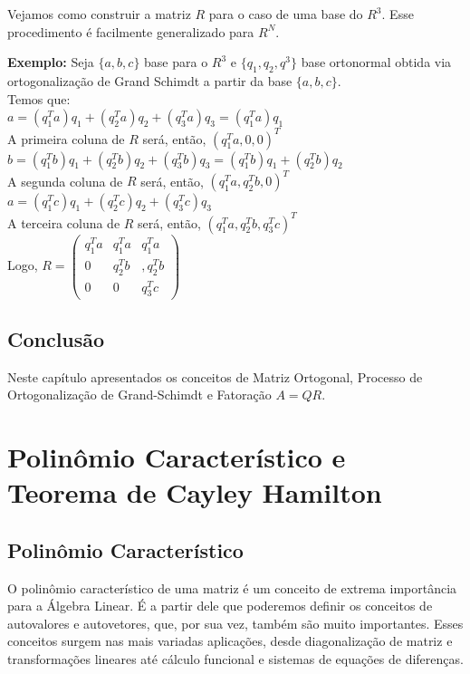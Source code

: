 \documentclass[12pt]{article}
\begin{document}
Vejamos como construir a matriz $R$ para o caso de uma base do $R^3$. Esse procedimento é facilmente generalizado para $R^N$.

\textbf{Exemplo:} Seja $\{a,b,c\}$ base para o $R^3$ e $\{q_1,q_2,q^3\}$ base ortonormal obtida via ortogonalização de Grand Schimdt a partir da base $\{a,b,c\}$.\\

Temos que:\\

$a=(q_1^Ta)q_1+(q_2^Ta)q_2+(q_3^Ta)q_3=(q_1^Ta)q_1$\\

A primeira coluna de $R$ será, então, $(q_1^{T}a,0,0)^T$\\

$b=(q_1^Tb)q_1+(q_2^Tb)q_2+(q_3^Tb)q_3=(q_1^Tb)q_1+(q_2^Tb)q_2$\\

A segunda coluna de $R$ será, então, $(q_1^{T}a,q_2^Tb,0)^T$\\

$a=(q_1^Tc)q_1+(q_2^Tc)q_2+(q_3^Tc)q_3$\\

A terceira coluna de $R$ será, então, $(q_1^{T}a,q_2^Tb,q_3^Tc)^T$\\

Logo, $R=\begin{pmatrix}
	q_1^{T}a & q_1^{T}a & q_1^{T}a\\
	0 &  q_2^Tb& ,q_2^Tb\\ 
	0 & 0 & q_3^Tc
\end{pmatrix}$

\subsection{Conclusão}
Neste capítulo apresentados os conceitos de Matriz Ortogonal, Processo de Ortogonalização de Grand-Schimdt e Fatoração $A=QR$.


\section{Polinômio Característico e Teorema de Cayley Hamilton}

\subsection{Polinômio Característico}

O polinômio característico de uma matriz é um conceito de extrema importância para a Álgebra Linear. É a partir dele que poderemos definir os conceitos de autovalores e autovetores, que, por sua vez, também são muito importantes. Esses conceitos surgem nas mais variadas aplicações, desde diagonalização de matriz e transformações lineares até cálculo funcional e sistemas de equações de diferenças.
\end{document}
